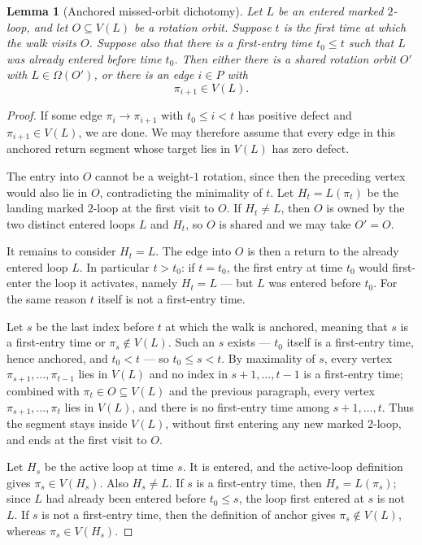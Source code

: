\documentclass[11pt]{article}
\newtheorem{lemma}[theorem]{Lemma}
\begin{document}
\begin{lemma}[Anchored missed-orbit dichotomy]\label{lem:missed}
Let \(L\) be an entered marked \(2\)-loop, and let \(O\subseteq V(L)\) be a rotation orbit.
Suppose \(t\) is the first time at which the walk visits \(O\).  Suppose also that there is a
first-entry time \(t_0\le t\) such that \(L\) was already entered before time \(t_0\).  Then either
there is a shared rotation orbit \(O'\) with \(L\in\Omega(O')\), or there is an edge \(i\in P\) with
\[
  \pi_{i+1}\in V(L).
\]
\end{lemma}

\begin{proof}
If some edge \(\pi_i\to\pi_{i+1}\) with \(t_0\le i<t\) has positive defect and
\(\pi_{i+1}\in V(L)\), we are done.  We may therefore assume that every edge in this anchored
return segment whose target lies in \(V(L)\) has zero defect.

The entry into \(O\) cannot be a weight-\(1\) rotation, since then the preceding vertex would also
lie in \(O\), contradicting the minimality of \(t\).  Let \(H_t=L(\pi_t)\) be the landing marked
\(2\)-loop at the first visit to \(O\).  If \(H_t\ne L\), then \(O\) is owned by the two distinct
entered loops \(L\) and \(H_t\), so \(O\) is shared and we may take \(O'=O\).

It remains to consider \(H_t=L\).  The edge into \(O\) is then a return to the already entered loop
\(L\).  In particular \(t>t_0\): if \(t=t_0\), the first entry at time \(t_0\) would first-enter the
loop it activates, namely \(H_t=L\) --- but \(L\) was entered before \(t_0\).  For the same reason
\(t\) itself is not a first-entry time.

Let \(s\) be the last index before \(t\) at which the walk is anchored, meaning that \(s\) is a
first-entry time or \(\pi_s\notin V(L)\).  Such an \(s\) exists --- \(t_0\) itself is a
first-entry time, hence anchored, and \(t_0<t\) --- so \(t_0\le s<t\).  By maximality of
\(s\), every vertex \(\pi_{s+1},\ldots,\pi_{t-1}\) lies in \(V(L)\) and no index in
\(s+1,\ldots,t-1\) is a first-entry time; combined with \(\pi_t\in O\subseteq V(L)\) and the
previous paragraph, every vertex \(\pi_{s+1},\ldots,\pi_t\) lies in \(V(L)\), and there is no
first-entry time among \(s+1,\ldots,t\).  Thus the segment stays inside \(V(L)\), without first entering any new marked
\(2\)-loop, and ends at the first visit to \(O\).

Let \(H_s\) be the active loop at time \(s\).  It is entered, and the active-loop definition gives
\(\pi_s\in V(H_s)\).  Also \(H_s\ne L\).  If \(s\) is a first-entry time, then \(H_s=L(\pi_s)\); since
\(L\) had already been entered before \(t_0\le s\), the loop first entered at \(s\) is not \(L\).  If
\(s\) is not a first-entry time, then the definition of anchor gives \(\pi_s\notin V(L)\), whereas
\(\pi_s\in V(H_s)\).


\end{proof}
\end{document}
